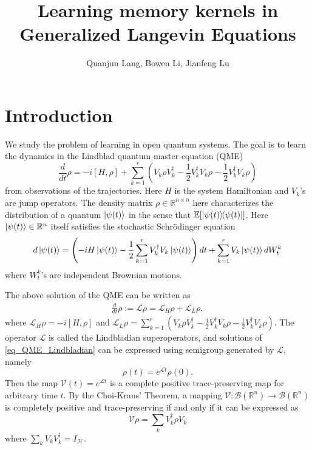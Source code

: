 \documentclass[10pt]{article}  %
\title{Learning memory kernels in Generalized Langevin Equations}
\author{Quanjun Lang, Bowen Li, Jianfeng Lu}
\date{}
\theoremstyle{plain}
\numberwithin{equation}{section}
\def\mH{\mathcal{H}}
\def\mL{\mathcal{L}}
\def\mV{\mathcal{V}}
\def\mB{\mathcal{B}}
\def\R{\mathbb{R}}
\begin{document}
\maketitle

\tableofcontents
\section{Introduction}
We study the problem of learning in open quantum systems. The goal is to learn the dynamics in the Lindblad quantum master equation (QME)
\begin{equation}\label{eq_QME_main}
	\frac{d}{dt} \rho = -i[H, \rho] + \sum_{k = 1}^r (V_k \rho V_k^\dagger - \frac{1}{2} V_k^\dagger V_k \rho - \frac{1}{2} V_k^\dagger V_k \rho)
\end{equation}
from observations of the trajectories. Here $H$ is the system Hamiltonian and $V_k$'s are jump operators. The density matrix $\rho \in \R^{n \times n}$ here characterizes the distribution of a quantum $\ket{\psi(t)}$ in the sense that $\mathbb{E}[\ketbra{\psi(t)}{\psi(t)}]$. 
Here $\ket{\psi(t)} \in \R^n$ itself satisfies the stochastic Schr\"{o}dinger equation
\begin{equation}
	d \ket{\psi(t)} = \left( -i H \ket{\psi(t)} - \frac{1}{2}\sum_{k = 1}^r V_k^\dagger V_k \ket{\psi(t)}\right) dt + \sum_{k = 1}^r V_k \ket{\psi(t)} dW^k_t
\end{equation}
where $W^k_t$'s are independent Brownian motions.


The above solution of the QME can be written as
\begin{align}\label{eq_QME_Lindbladian}
	\frac{d}{dt} \rho := \mL \rho =  \mL_H\rho + \mL_L \rho, 
\end{align}
where $\mL_H \rho = -i[H, \rho]$ and $\mL_L \rho = \sum_{k = 1}^r (V_k \rho V_k^\dagger - \frac{1}{2} V_k^\dagger V_k \rho - \frac{1}{2} V_k^\dagger V_k \rho)$. The operator $\mL$ is called the Lindbladian superoperators, and solutions of \eqref{eq_QME_Lindbladian} can be expressed using semigroup generated by $\mL$, namely
\begin{equation}
	\rho(t) = e^{\mL t}\rho(0).
\end{equation}
Then the map $\mV(t) = e^{\mL t}$ is a complete positive trace-preserving map for arbitrary time $t$. By the Choi-Kraus' Theorem, a mapping $\mV:\mB(\R^n) \to \mB(\R^n)$ is completely positive and trace-preserving if and only if it can be expressed as 
\begin{equation}
	\mV\rho = \sum_{k}V_k^\dagger \rho V_k
\end{equation}
where $\sum_{k}V_kV_k^\dagger = I_\mH$. 
\end{document}
